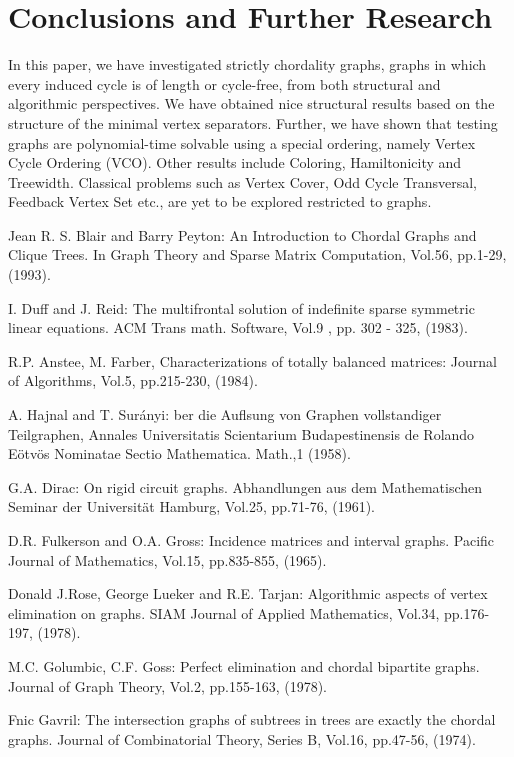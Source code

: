 \documentclass[runningheads]{llncs}
\begin{document}
\section{Conclusions and Further Research}
In this paper, we have investigated strictly chordality  graphs, graphs in which every induced cycle is of length  or cycle-free, from both structural and algorithmic perspectives. We have obtained nice structural results based on the structure of the minimal vertex separators. Further, we have shown that testing  graphs are polynomial-time solvable using a special ordering, namely Vertex Cycle Ordering (VCO). Other results include Coloring, Hamiltonicity and Treewidth. Classical problems such as Vertex Cover, Odd Cycle Transversal, Feedback Vertex Set etc., are yet to be explored restricted to  graphs. 
\nocite{*}
\begin{thebibliography}{}

Jean R. S. Blair and Barry Peyton: An Introduction to Chordal Graphs and Clique Trees. In Graph Theory and Sparse Matrix Computation, Vol.56, pp.1-29, (1993).

I. Duff and J. Reid: The multifrontal solution of indefinite sparse symmetric linear equations. ACM Trans math. Software, Vol.9 , pp. 302 - 325, (1983).

R.P. Anstee, M. Farber, Characterizations of totally balanced matrices: Journal of Algorithms, Vol.5, pp.215-230, (1984).

A. Hajnal and T. Surányi: ber die Auflsung von Graphen vollstandiger Teilgraphen, Annales Universitatis Scientarium Budapestinensis de Rolando Eötvös Nominatae
Sectio Mathematica. Math.,1 (1958).


G.A. Dirac: On rigid circuit graphs. Abhandlungen aus dem Mathematischen Seminar der Universität Hamburg, Vol.25, pp.71-76, (1961).

D.R. Fulkerson and O.A. Gross: Incidence matrices and interval graphs. Pacific Journal of Mathematics, Vol.15, pp.835-855, (1965).

Donald J.Rose,  George Lueker and R.E. Tarjan: Algorithmic aspects of vertex elimination on graphs. SIAM Journal of Applied Mathematics, Vol.34, pp.176-197, (1978).

M.C. Golumbic, C.F. Goss: Perfect elimination and chordal bipartite graphs. Journal of Graph Theory, Vol.2, pp.155-163, (1978).

Fnic Gavril: The intersection graphs of subtrees in trees are exactly the chordal graphs. Journal of Combinatorial Theory, Series B, Vol.16, pp.47-56, (1974).


\end{thebibliography}
\end{document}
